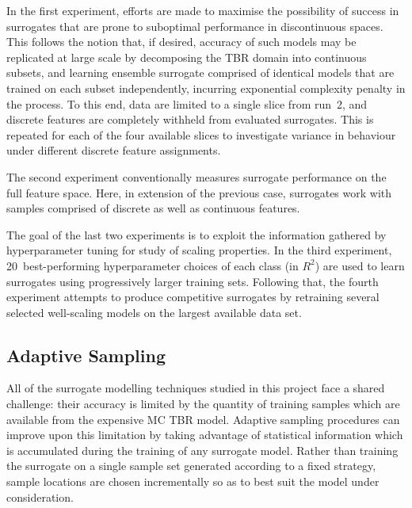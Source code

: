 
In the first experiment, efforts are made to maximise the possibility of success
in surrogates that are prone to suboptimal performance in discontinuous spaces.
This follows the notion that, if desired, accuracy of such models may be
replicated at large scale by decomposing the TBR domain into continuous subsets,
and learning ensemble surrogate comprised of identical models that are trained on each
subset independently, incurring exponential complexity penalty in the process.
To this end, data are limited to a single slice from run~2, and discrete
features are completely withheld from evaluated
surrogates. This is repeated for each of the four available slices to
investigate variance in behaviour under different discrete feature assignments.

The second experiment conventionally measures surrogate performance on the full
feature space. Here, in extension of the previous case, surrogates work with
samples comprised of discrete as well as continuous features.

The goal of the last two experiments is to exploit the information gathered by
hyperparameter tuning for study of scaling properties. In
the third experiment, 20~best-performing hyperparameter choices of each class
(in $R^2$) are used to learn surrogates using progressively larger training sets. Following
that, the fourth experiment attempts to produce competitive surrogates by
retraining several selected well-scaling models on the largest available data set.


\subsection{Adaptive Sampling}
\label{sec:adaptive}

All of the surrogate modelling techniques studied in this project face a shared
challenge: their accuracy is limited by the quantity of training samples which
are available from the expensive MC TBR model. Adaptive sampling procedures can
improve upon this limitation by taking advantage of statistical information
which is accumulated during the training of any surrogate model. Rather than
training the surrogate on a single sample set generated according to a fixed
strategy, sample locations are chosen incrementally so as to best suit the model
under consideration.

